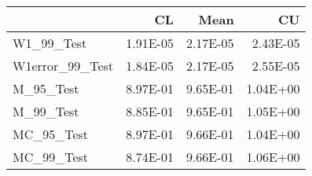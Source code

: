 \begin{tabular}{lrrr}
\toprule
{} &       CL &     Mean &       CU \\
\midrule
W1\_99\_Test      & 1.91E-05 & 2.17E-05 & 2.43E-05 \\
W1error\_99\_Test & 1.84E-05 & 2.17E-05 & 2.55E-05 \\
M\_95\_Test       & 8.97E-01 & 9.65E-01 & 1.04E+00 \\
M\_99\_Test       & 8.85E-01 & 9.65E-01 & 1.05E+00 \\
MC\_95\_Test      & 8.97E-01 & 9.66E-01 & 1.04E+00 \\
MC\_99\_Test      & 8.74E-01 & 9.66E-01 & 1.06E+00 \\
\bottomrule
\end{tabular}
